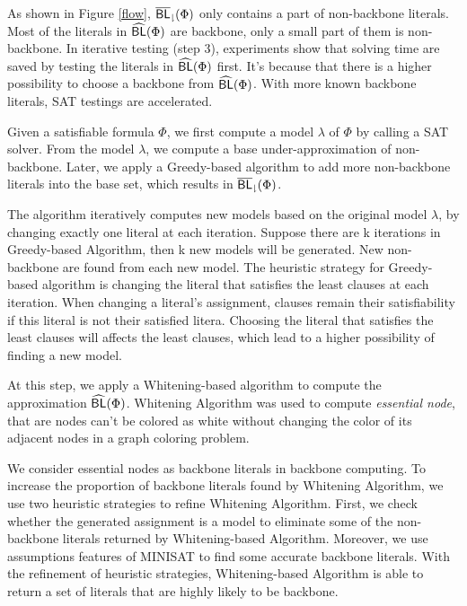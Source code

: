 As shown in Figure \ref{flow}, ${\sf \overline{BL}_\downharpoonright}(\Phi)$ only contains a part of non-backbone literals.
Most of the literals in ${\sf \widehat{BL}}(\Phi)$ are backbone, only a small part of them is non-backbone.
In iterative testing (step 3), experiments show that solving time are saved by testing the literals in ${\sf \widehat{BL}}(\Phi)$ first. It's because that there is a higher possibility to choose a backbone from ${\sf \widehat{BL}}(\Phi)$. With more known backbone literals, SAT testings are accelerated.

\medskip
{}
Given a satisfiable formula $\Phi$, we first compute a model $\lambda$ of $\Phi$ by calling a SAT solver.
From the model $\lambda$, we compute a base under-approximation of non-backbone.
Later, we apply a Greedy-based algorithm to add more non-backbone literals into the base set, which results in ${\sf \overline{BL}_\downharpoonright}(\Phi)$.

The algorithm iteratively computes new models based on the original model $\lambda$, by changing exactly one literal at each iteration. Suppose there are k iterations in Greedy-based Algorithm, then k new models will be generated. New non-backbone are found from each new model. The heuristic strategy for Greedy-based algorithm is changing the literal that satisfies the least clauses at each iteration. When changing a literal's assignment, clauses remain their satisfiability if this literal is not their satisfied litera. Choosing the literal that satisfies the least clauses will affects the least clauses, which lead to a higher possibility of finding a new model.

\medskip
{}
At this step, we apply a Whitening-based algorithm to compute the approximation ${\sf \widehat{BL}}(\Phi)$.
Whitening Algorithm was used to compute \emph{essential node}, that are nodes can't be colored as white without changing the color of its adjacent nodes in a graph coloring problem.


We consider essential nodes as backbone literals in backbone computing.
To increase the proportion of backbone literals found by Whitening Algorithm, we use two heuristic strategies to refine Whitening Algorithm.
First, we check whether the generated assignment is a model to eliminate some of the non-backbone literals returned by Whitening-based Algorithm.
Moreover, we use assumptions features of MINISAT \cite{JLM15} to find some accurate backbone literals.
With the refinement of heuristic strategies, Whitening-based Algorithm is able to return a set of literals that are highly likely to be backbone.


